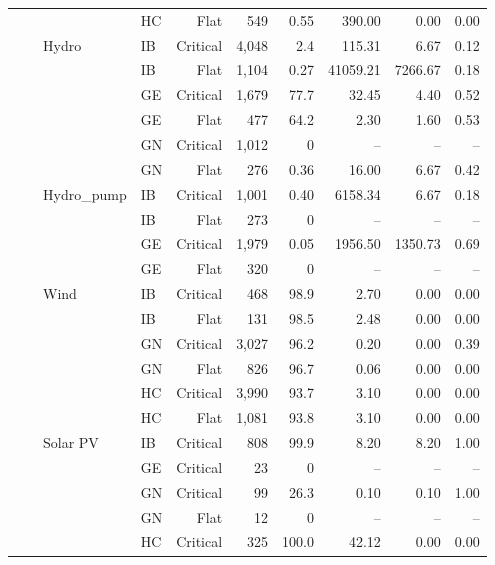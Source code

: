 \begin{longtable}{@{}l l l l r r r r r r@{}}
 &  &  & HC & Flat & 549 & 0.55 & 390.00 & 0.00 & 0.00 \\
\addlinespace
 &  & Hydro & IB & Critical & 4,048 & 2.4 & 115.31 & 6.67 & 0.12 \\
 &  &  & IB & Flat & 1,104 & 0.27 & 41059.21 & 7266.67 & 0.18 \\
 &  &  & GE & Critical & 1,679 & 77.7 & 32.45 & 4.40 & 0.52 \\
 &  &  & GE & Flat & 477 & 64.2 & 2.30 & 1.60 & 0.53 \\
 &  &  & GN & Critical & 1,012 & 0 & -- & -- & -- \\
 &  &  & GN & Flat & 276 & 0.36 & 16.00 & 6.67 & 0.42 \\
\addlinespace
 &  & Hydro\_pump & IB & Critical & 1,001 & 0.40 & 6158.34 & 6.67 & 0.18 \\
 &  &  & IB & Flat & 273 & 0 & -- & -- & -- \\
 &  &  & GE & Critical & 1,979 & 0.05 & 1956.50 & 1350.73 & 0.69 \\
 &  &  & GE & Flat & 320 & 0 & -- & -- & -- \\
\addlinespace
 &  & Wind & IB & Critical & 468 & 98.9 & 2.70 & 0.00 & 0.00 \\
 &  &  & IB & Flat & 131 & 98.5 & 2.48 & 0.00 & 0.00 \\
 &  &  & GN & Critical & 3,027 & 96.2 & 0.20 & 0.00 & 0.39 \\
 &  &  & GN & Flat & 826 & 96.7 & 0.06 & 0.00 & 0.00 \\
 &  &  & HC & Critical & 3,990 & 93.7 & 3.10 & 0.00 & 0.00 \\
 &  &  & HC & Flat & 1,081 & 93.8 & 3.10 & 0.00 & 0.00 \\
\addlinespace
 &  & Solar PV & IB & Critical & 808 & 99.9 & 8.20 & 8.20 & 1.00 \\
 &  &  & GE & Critical & 23 & 0 & -- & -- & -- \\
 &  &  & GN & Critical & 99 & 26.3 & 0.10 & 0.10 & 1.00 \\
 &  &  & GN & Flat & 12 & 0 & -- & -- & -- \\
 &  &  & HC & Critical & 325 & 100.0 & 42.12 & 0.00 & 0.00 \\
\end{longtable}
\normalsize
